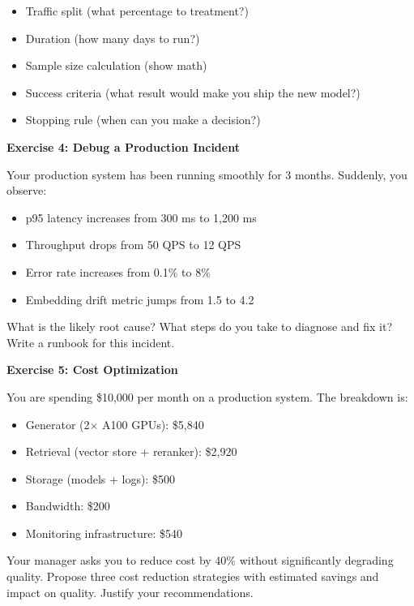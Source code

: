 \begin{itemize}
\item Traffic split (what percentage to treatment?)
\item Duration (how many days to run?)
\item Sample size calculation (show math)
\item Success criteria (what result would make you ship the new model?)
\item Stopping rule (when can you make a decision?)
\end{itemize}

\vspace{0.5em}

\textbf{Exercise 4: Debug a Production Incident}

Your production system has been running smoothly for 3 months. Suddenly, you observe:

\begin{itemize}
\item p95 latency increases from 300 ms to 1,200 ms
\item Throughput drops from 50 QPS to 12 QPS
\item Error rate increases from 0.1\% to 8\%
\item Embedding drift metric jumps from 1.5 to 4.2
\end{itemize}

What is the likely root cause? What steps do you take to diagnose and fix it? Write a runbook for this incident.

\vspace{0.5em}

\textbf{Exercise 5: Cost Optimization}

You are spending \$10,000 per month on a production system. The breakdown is:

\begin{itemize}
\item Generator (2$\times$ A100 GPUs): \$5,840
\item Retrieval (vector store + reranker): \$2,920
\item Storage (models + logs): \$500
\item Bandwidth: \$200
\item Monitoring infrastructure: \$540
\end{itemize}

Your manager asks you to reduce cost by 40\% without significantly degrading quality. Propose three cost reduction strategies with estimated savings and impact on quality. Justify your recommendations.

